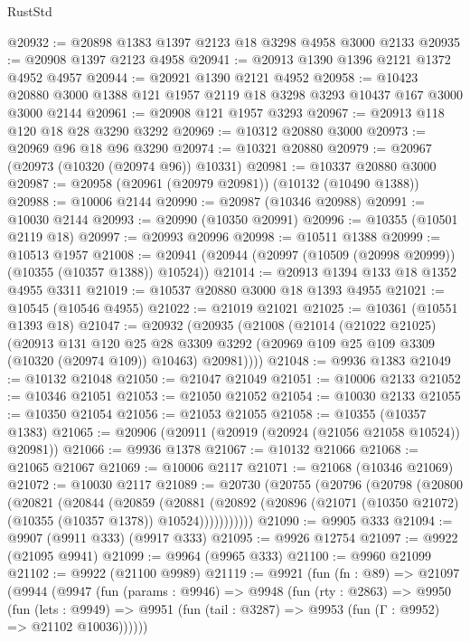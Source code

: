 \begin{lexlean}{RustStd}
\begin{coremodule}
@20932 := @20898 @1383 @1397 @2123 @18 @3298 @4958 @3000 @2133
@20935 := @20908 @1397 @2123 @4958
@20941 := @20913 @1390 @1396 @2121 @1372 @4952 @4957
@20944 := @20921 @1390 @2121 @4952
@20958 := @10423 @20880 @3000 @1388 @121 @1957 @2119 @18 @3298 @3293 @10437 @167 @3000 @3000 @2144
@20961 := @20908 @121 @1957 @3293
@20967 := @20913 @118 @120 @18 @28 @3290 @3292
@20969 := @10312 @20880 @3000
@20973 := @20969 @96 @18 @96 @3290
@20974 := @10321 @20880
@20979 := @20967 (@20973 (@10320 (@20974 @96)) @10331)
@20981 := @10337 @20880 @3000
@20987 := @20958 (@20961 (@20979 @20981)) (@10132 (@10490 @1388))
@20988 := @10006 @2144
@20990 := @20987 (@10346 @20988)
@20991 := @10030 @2144
@20993 := @20990 (@10350 @20991)
@20996 := @10355 (@10501 @2119 @18)
@20997 := @20993 @20996
@20998 := @10511 @1388
@20999 := @10513 @1957
@21008 := @20941 (@20944 (@20997 (@10509 (@20998 @20999)) (@10355 (@10357 @1388)) @10524))
@21014 := @20913 @1394 @133 @18 @1352 @4955 @3311
@21019 := @10537 @20880 @3000 @18 @1393 @4955
@21021 := @10545 (@10546 @4955)
@21022 := @21019 @21021
@21025 := @10361 (@10551 @1393 @18)
@21047 := @20932
    (@20935
      (@21008
        (@21014
          (@21022 @21025)
          (@20913
            @131
            @120
            @25
            @28
            @3309
            @3292
            (@20969 @109 @25 @109 @3309 (@10320 (@20974 @109)) @10463)
            @20981))))
@21048 := @9936 @1383
@21049 := @10132 @21048
@21050 := @21047 @21049
@21051 := @10006 @2133
@21052 := @10346 @21051
@21053 := @21050 @21052
@21054 := @10030 @2133
@21055 := @10350 @21054
@21056 := @21053 @21055
@21058 := @10355 (@10357 @1383)
@21065 := @20906 (@20911 (@20919 (@20924 (@21056 @21058 @10524)) @20981))
@21066 := @9936 @1378
@21067 := @10132 @21066
@21068 := @21065 @21067
@21069 := @10006 @2117
@21071 := @21068 (@10346 @21069)
@21072 := @10030 @2117
@21089 := @20730
    (@20755
      (@20796
        (@20798
          (@20800
            (@20821
              (@20844
                (@20859
                  (@20881
                    (@20892
                      (@20896 (@21071 (@10350 @21072) (@10355 (@10357 @1378)) @10524)))))))))))
@21090 := @9905 @333
@21094 := @9907 (@9911 @333) (@9917 @333)
@21095 := @9926 @12754
@21097 := @9922 (@21095 @9941)
@21099 := @9964 (@9965 @333)
@21100 := @9960 @21099
@21102 := @9922 (@21100 @9989)
@21119 := @9921
    (fun (fn : @89) =>
    @21097
      (@9944
        (@9947
          (fun (params : @9946) =>
          @9948
            (fun (rty : @2863) =>
            @9950
              (fun (lets : @9949) =>
              @9951 (fun (tail : @3287) => @9953 (fun (Γ : @9952) => @21102 @10036))))))

\end{coremodule}
\end{lexlean}
